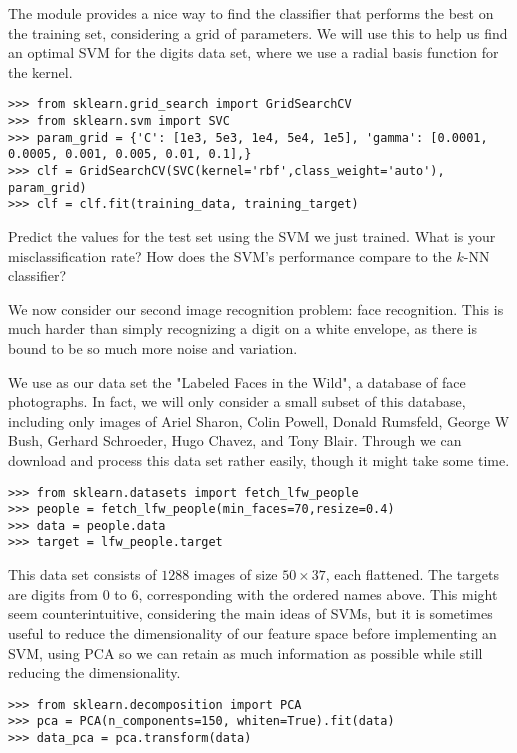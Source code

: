 The module  provides a nice way to find the classifier that performs the best on the training set, considering a grid of parameters. We will use this to help us find an optimal SVM for the digits data set, where we use a radial basis function for the kernel.
\begin{lstlisting}
>>> from sklearn.grid_search import GridSearchCV
>>> from sklearn.svm import SVC
>>> param_grid = {'C': [1e3, 5e3, 1e4, 5e4, 1e5], 'gamma': [0.0001, 0.0005, 0.001, 0.005, 0.01, 0.1],}
>>> clf = GridSearchCV(SVC(kernel='rbf',class_weight='auto'), param_grid)
>>> clf = clf.fit(training_data, training_target)
\end{lstlisting}

\begin{problem}
Predict the values for the test set using the SVM we just trained. What is your misclassification rate? How does the SVM's performance compare to the $k$-NN classifier?
\end{problem}

We now consider our second image recognition problem: face recognition. This is much harder than simply recognizing a digit on a white envelope, as there is bound to be so much more noise and variation.

We use as our data set the "Labeled Faces in the Wild", a database of face photographs. In fact, we will only consider a small subset of this database, including only images of Ariel Sharon, Colin Powell, Donald Rumsfeld, George W Bush, Gerhard Schroeder, Hugo Chavez, and Tony Blair. Through  we can download and process this data set rather easily, though it might take some time.
\begin{lstlisting}
>>> from sklearn.datasets import fetch_lfw_people
>>> people = fetch_lfw_people(min_faces=70,resize=0.4)
>>> data = people.data
>>> target = lfw_people.target
\end{lstlisting}

This data set consists of $1288$ images of size $50 \times 37$, each flattened. The targets are digits from $0$ to $6$, corresponding with the ordered names above. This might seem counterintuitive, considering the main ideas of SVMs, but it is sometimes useful to reduce the dimensionality of our feature space before implementing an SVM, using PCA so we can retain as much information as possible while still reducing the dimensionality.
\begin{lstlisting}
>>> from sklearn.decomposition import PCA
>>> pca = PCA(n_components=150, whiten=True).fit(data)
>>> data_pca = pca.transform(data)
\end{lstlisting}

